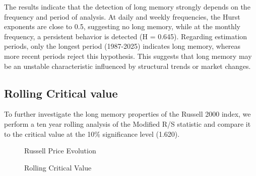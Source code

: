 \documentclass[11pt]{extarticle}
\begin{document}
\FloatBarrier

The results indicate that the detection of long memory strongly depends on the frequency and period of analysis.
At daily and weekly frequencies, the Hurst exponents are close to 0.5, suggesting no long memory, while at the monthly
frequency, a persistent behavior is detected (H = 0.645). Regarding estimation periods, only the longest period
(1987-2025) indicates long memory, whereas more recent periods reject this hypothesis. This suggests that long memory
may be an unstable characteristic influenced by structural trends or market changes.


\subsection{Rolling Critical value}

To further investigate the long memory properties of the Russell 2000 index,
we perform a ten year rolling analysis of the Modified R/S statistic and compare it to the critical value at the
10\% significance level (1.620).



\begin{figure}[htbp]
    \centering
    \caption{Russell Price Evolution}
\end{figure}

\begin{figure}[htbp]
    \centering
    \caption{Rolling Critical Value}
\end{figure}
\end{document}
